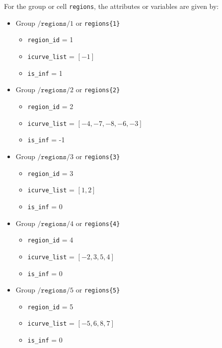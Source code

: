 \documentclass[11pt]{article}
\theoremstyle{definition}
\theoremstyle{remark}
\numberwithin{equation}{section}
\begin{document}
For the group or cell \texttt{regions}, the attributes or variables are given by:
\begin{itemize}
\item Group $/\texttt{regions}/1$ or \texttt{regions\{1\}}
\begin{itemize}
\item \texttt{region\_id} = 1
\item \texttt{icurve\_list} = $[-1]$
\item \texttt{is\_inf} = 1
\end{itemize}

\item Group $/\texttt{regions}/2$ or \texttt{regions\{2\}}
\begin{itemize}
\item \texttt{region\_id} = 2
\item \texttt{icurve\_list} = $[-4,-7,-8,-6,-3]$
\item \texttt{is\_inf} = -1
\end{itemize}


\item Group $/\texttt{regions}/3$ or \texttt{regions\{3\}}
\begin{itemize}
\item \texttt{region\_id} = 3
\item \texttt{icurve\_list} = $[1,2]$
\item \texttt{is\_inf} = 0
\end{itemize}


\item Group $/\texttt{regions}/4$ or \texttt{regions\{4\}}
\begin{itemize}
\item \texttt{region\_id} = 4
\item \texttt{icurve\_list} = $[-2,3,5,4]$
\item \texttt{is\_inf} = 0
\end{itemize}


\item Group $/\texttt{regions}/5$ or \texttt{regions\{5\}}
\begin{itemize}
\item \texttt{region\_id} = 5
\item \texttt{icurve\_list} = $[-5,6,8,7]$
\item \texttt{is\_inf} = 0
\end{itemize}

\end{itemize}
\end{document}
